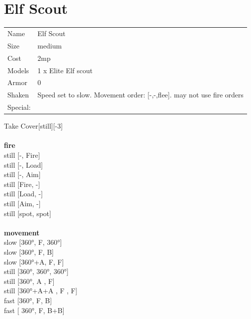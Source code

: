 \ \\
 
\ \\













\clearpage

\section{ Elf Scout }

\begin{tabular}{ll}
  Name & Elf Scout \\
  Size & medium\\
  Cost & 2mp\\
  Models & 1 x Elite Elf scout\\
  Armor & 0\\
  Shaken & Speed set to slow. Movement order: [-,-,flee]. may not use fire orders\\
  Special: \\
\end{tabular}

\noindent Take Cover[still][-3]\\ 


\ \\ {\bf fire } \\
still [-, Fire] \\
still [-, Load] \\
still [-, Aim] \\
still [Fire, -] \\
still [Load, -] \\
still [Aim, -] \\
still [spot, spot] \\
\ \\ {\bf movement } \\
slow [360°, F, 360°] \\
slow [360°, F, B] \\
slow [360°+A, F, F] \\
still [360°, 360°, 360°] \\
still [360°, A , F] \\
still [360°+A+A , F , F] \\
fast [360°, F, B] \\
fast [ 360°,  F, B+B] \\


